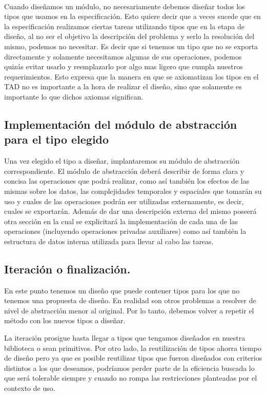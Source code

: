 \documentclass[10pt, a4paper]{report}
\begin{document}
~

Cuando dise\~namos un m\'odulo, no necesariamente debemos dise\~nar todos los tipos que usamos en la especificaci\'on. Esto quiere decir que a veces sucede que en la especificaci\'on realizamos ciertas tareas utilizando tipos que en la etapa de dise\~no, al no ser el objetivo la descripci\'on del problema y serlo la resoluci\'on del mismo, podemos no necesitar. Es decir que si tenemos un tipo que no se exporta directamente y solamente necesitamos algunas de sus operaciones, podemos quiz\'as evitar usarlo y reemplazarlo por algo mas ligero que cumpla nuestros requerimientos. Esto expresa que la manera en que se axiomatizan los tipos en el TAD no es importante a la hora de realizar el dise\~no, sino que solamente es importante lo que dichos axiomas significan.

\subsection{Implementaci\'on del m\'odulo de abstracci\'on para el tipo elegido}

Una vez elegido el tipo a dise\~nar, implantaremos su m\'odulo de abstracci\'on correspondiente. El m\'odulo de abstracci\'on deber\'a describir de forma clara y concisa las operaciones que podr\'a realizar, como as\'i tambi\'en los efectos de las mismas sobre los datos, las complejidades temporales y espaciales que tomar\'an su uso y cuales de las operaciones podr\'an ser utilizadas externamente, es decir, cuales se exportar\'an. Adem\'as de dar una descripci\'on externa del mismo poseer\'a otra secci\'on en la cual se explicitar\'a la implementaci\'on de cada una de las operaciones (incluyendo operaciones privadas auxiliares) como as\'i tambi\'en la estructura de datos interna utilizada para llevar al cabo las tareas.

\subsection{Iteraci\'on o finalizaci\'on.}
En este punto tenemos un dise\~no que puede contener tipos para los que no tenemos una propuesta de dise\~no. En realidad son otros problemas a resolver de nivel de abstracci\'on menor al original. Por lo tanto, debemos volver a repetir el m\'etodo con los nuevos tipos a dise\~nar.

La iteraci\'on prosigue hasta llegar a tipos que tengamos dise\~nados en nuestra biblioteca o sean primitivos. Por otro lado, la reutilizaci\'on de tipos ahorra tiempo de dise\~no pero ya que es posible reutilizar tipos que fueron dise\~nados con criterios distintos a los que deseamos, podr\'iamos perder parte de la eficiencia buscada lo que ser\'a tolerable siempre y cuando no rompa las restricciones planteadas por el contexto de uso.
\end{document}
